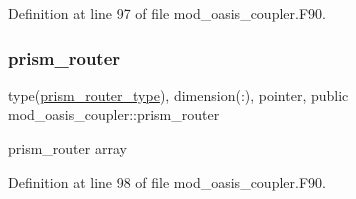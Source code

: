 Definition at line 97 of file mod\+\_\+oasis\+\_\+coupler.\+F90.

\mbox{\label{namespacemod__oasis__coupler_a33dbf692ad73f83f73fe083e252badd8}} 
\subsubsection{\texorpdfstring{prism\+\_\+router}{prism\_router}}
{\footnotesize\ttfamily type(\hyperlink{structmod__oasis__coupler_1_1prism__router__type}{prism\+\_\+router\+\_\+type}), dimension(\+:), pointer, public mod\+\_\+oasis\+\_\+coupler\+::prism\+\_\+router}



prism\+\_\+router array 



Definition at line 98 of file mod\+\_\+oasis\+\_\+coupler.\+F90.

